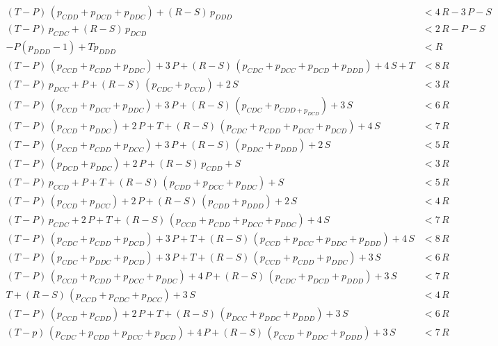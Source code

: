\documentclass{article}
\theoremstyle{definition}
\begin{document}
\begin{equation*}
  \begin{array}{lcll}
     (T - P)\, \left(p_{CDD} + p_{DCD} + p_{DDC}\right) + (R - S)\, p_{DDD} & < 4\,R - 3\,P - S\\
     (T - P)\, p_{CDC} +  (R - S)\, p_{DCD} & < 2\,R - P - S\\
    - P \left(p_{DDD} - 1\right) + T p_{DDD} & < R \\
     (T - P)\, (p_{CCD} + p_{CDD} + p_{DDC}) + 3\,P + (R - S)\, (p_{CDC} + p_{DCC} + p_{DCD} + p_{DDD}) + 4\,S + T & < 8\,R \\
     (T - P)\, p_{DCC} + P + (R - S)\, (p_{CDC} + p_{CCD}) + 2\,S  & < 3\,R \\
     (T - P)\, (p_{CCD} + p_{DCC} + p_{DDC}) + 3\,P + (R - S)\, (p_{CDC} + p_{CDD + p_{DCD}}) + 3\,S  & < 6\,R \\
     (T - P)\, (p_{CCD} + p_{DDC}) + 2\,P + T + (R - S)\, (p_{CDC} + p_{CDD} + p_{DCC} + p_{DCD}) + 4\,S  & < 7\,R \\
     (T - P)\, (p_{CCD} + p_{CDD} + p_{DCC}) + 3\,P + (R - S)\, (p_{DDC} + p_{DDD}) + 2\,S  & < 5\,R \\
     (T - P)\, (p_{DCD} + p_{DDC}) + 2\,P + (R - S)\, p_{CDD} + S  & < 3\,R \\
     (T - P)\, p_{CCD} + P + T + (R - S)\, (p_{CDD} + p_{DCC} + p_{DDC}) + S & < 5\,R \\
     (T - P)\, (p_{CCD} + p_{DCC}) + 2\,P + (R - S)\, (p_{CDD} + p_{DDD}) + 2\,S & < 4\,R \\
     (T - P)\, p_{CDC} + 2\, P + T + (R - S)\, (p_{CCD} + p_{CDD} + p_{DCC} + p_{DDC}) + 4\,S & < 7\,R \\
     (T - P)\, (p_{CDC} + p_{CDD} + p_{DCD}) + 3\, P + T + (R - S)\, (p_{CCD} + p_{DCC} + p_{DDC} + p_{DDD}) + 4\,S & < 8\,R \\
     (T - P)\, (p_{CDC} + p_{DDC} + p_{DCD}) + 3\, P + T + (R - S)\, (p_{CCD} + p_{CDD} + p_{DDC}) + 3\,S & < 6\,R \\
     (T - P)\, (p_{CCD} + p_{CDD} + p_{DCC} + p_{DDC}) + 4\, P + (R - S)\, (p_{CDC} + p_{DCD} + p_{DDD}) + 3\,S & < 7\,R \\
     T  + (R - S)\, (p_{CCD} + p_{CDC} + p_{DCC}) + 3\,S & < 4\,R \\
     (T - P)\, (p_{CCD} + p_{CDD}) + 2\,P + T + (R - S)\, (p_{DCC} + p_{DDC} + p_{DDD}) + 3\,S & < 6\,R \\
     (T - p)\, (p_{CDC} + p_{CDD} + p_{DCC} + p_{DCD}) + 4\,P + (R - S)\, (p_{CCD} + p_{DDC} + p_{DDD}) + 3\,S & < 7\,R \\
    \end{array}
\end{equation*}
\end{document}
